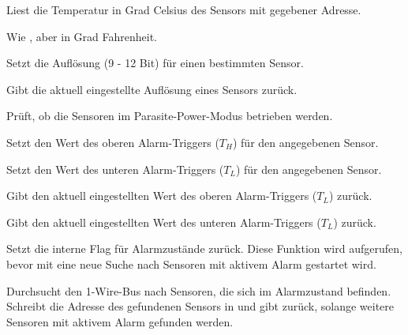 \begin{description}
		Liest die Temperatur in Grad Celsius des Sensors mit gegebener Adresse.
		
		\item {} 
		
		Wie , aber in Grad Fahrenheit.
		
		\item {} 
		 
		Setzt die Auflösung (9 - 12 Bit) für einen bestimmten Sensor.
		
		\item {} 
		
		Gibt die aktuell eingestellte Auflösung eines Sensors zurück.
		
		\item {} 
		
		Prüft, ob die Sensoren im Parasite-Power-Modus betrieben werden.
		
		\item {} 
		 
		Setzt den Wert des oberen Alarm-Triggers ($T_H$) für den angegebenen Sensor.
		
		\item {} 
		
		Setzt den Wert des unteren Alarm-Triggers ($T_L$) für den angegebenen Sensor.
		
		\item {} 
		 
		Gibt den aktuell eingestellten Wert des oberen Alarm-Triggers ($T_L$) zurück.
		
		\item {} 
		 
		Gibt den aktuell eingestellten Wert des unteren Alarm-Triggers ($T_L$) zurück.
		
		\item {} 
		
		Setzt die interne Flag für Alarmzustände zurück. Diese Funktion wird aufgerufen, bevor mit  eine neue Suche nach Sensoren mit aktivem Alarm gestartet wird.
		
		\item {} 
		
		Durchsucht den 1-Wire-Bus nach Sensoren, die sich im Alarmzustand befinden. Schreibt die Adresse des gefundenen Sensors in  und gibt  zurück, solange weitere Sensoren mit aktivem Alarm gefunden werden.
		
		
	\end{description}



